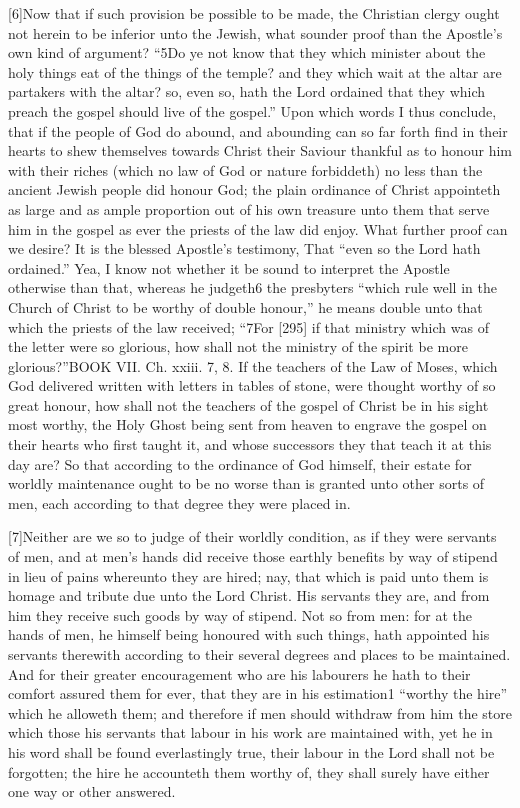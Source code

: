 [6]Now that if such provision be possible to be made, the Christian clergy ought not herein to be inferior unto the Jewish, what sounder proof than the Apostle’s own kind of argument? “5Do ye not know that they which minister about the holy things eat of the things of the temple? and they which wait at the altar are partakers with the altar? so, even so, hath the Lord ordained that they which preach the gospel should live of the gospel.” Upon which words I thus conclude, that if the people of God do abound, and abounding can so far forth find in their hearts to shew themselves towards Christ their Saviour thankful as to honour him with their riches (which no law of God or nature forbiddeth) no less than the ancient Jewish people did honour God; the plain ordinance of Christ appointeth as large and as ample proportion out of his own treasure unto them that serve him in the gospel as ever the priests of the law did enjoy. What further proof can we desire? It is the blessed Apostle’s testimony, That “even so the Lord hath ordained.” Yea, I know not whether it be sound to interpret the Apostle otherwise than that, whereas he judgeth6 the presbyters “which rule well in the Church of Christ to be worthy of double honour,” he means double unto that which the priests of the law received; “7For [295] if that ministry which was of the letter were so glorious, how shall not the ministry of the spirit be more glorious?”BOOK VII. Ch. xxiii. 7, 8. If the teachers of the Law of Moses, which God delivered written with letters in tables of stone, were thought worthy of so great honour, how shall not the teachers of the gospel of Christ be in his sight most worthy, the Holy Ghost being sent from heaven to engrave the gospel on their hearts who first taught it, and whose successors they that teach it at this day are? So that according to the ordinance of God himself, their estate for worldly maintenance ought to be no worse than is granted unto other sorts of men, each according to that degree they were placed in.

[7]Neither are we so to judge of their worldly condition, as if they were servants of men, and at men’s hands did receive those earthly benefits by way of stipend in lieu of pains whereunto they are hired; nay, that which is paid unto them is homage and tribute due unto the Lord Christ. His servants they are, and from him they receive such goods by way of stipend. Not so from men: for at the hands of men, he himself being honoured with such things, hath appointed his servants therewith according to their several degrees and places to be maintained. And for their greater encouragement who are his labourers he hath to their comfort assured them for ever, that they are in his estimation1 “worthy the hire” which he alloweth them; and therefore if men should withdraw from him the store which those his servants that labour in his work are maintained with, yet he in his word shall be found everlastingly true, their labour in the Lord shall not be forgotten; the hire he accounteth them worthy of, they shall surely have either one way or other answered.

